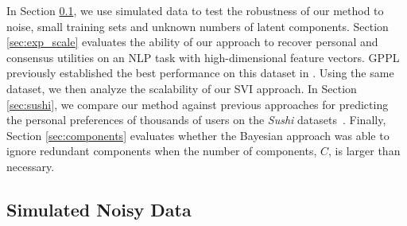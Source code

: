 In Section \ref{sec:exp_synth}, we use simulated data to test the robustness of our method to noise, small training sets and unknown numbers of latent components.
Section \ref{sec:exp_scale} evaluates the ability of our approach to
recover personal and consensus utilities on an NLP task with high-dimensional feature vectors.
GPPL previously established the best performance on this dataset in \citet{simpson2018finding}.
Using the same dataset, we then analyze the scalability of our SVI approach. 
In Section \ref{sec:sushi}, 
we compare our method against previous approaches for predicting the 
personal preferences of thousands of users on the \emph{Sushi} datasets~\citep{kamishima2003nantonac}.
Finally, Section \ref{sec:components} evaluates whether the Bayesian approach was able to ignore redundant
components when the number of components, $C$,
 is larger than necessary.




\subsection{Simulated Noisy Data}\label{sec:exp_synth}

